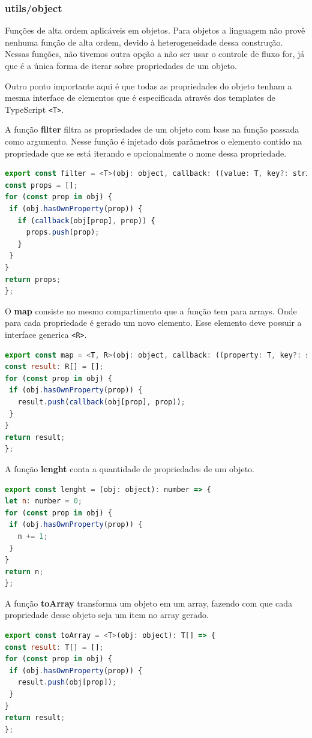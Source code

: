 \documentclass[rel_mlp]{iiufrgs}
\begin{document}
\subsubsection{utils/object}
Funções de alta ordem aplicáveis em objetos. Para objetos a linguagem não provê nenhuma função de alta ordem, devido à heterogeneidade dessa construção. Nessas funções, não tivemos outra opção a não ser usar o controle de fluxo for, já que é a única forma de iterar sobre propriedades de um objeto. \par Outro ponto importante aqui é que todas as propriedades do objeto tenham a mesma interface de elementos que é especificada através dos templates de TypeScript \verb|<T>|.

A função \textbf{filter} filtra as propriedades de um objeto com base na função passada como argumento. Nesse função é injetado dois parâmetros o elemento contido na propriedade que se está iterando e opcionalmente o nome dessa propriedade.

\begin{lstlisting}[language=JavaScript]
export const filter = <T>(obj: object, callback: ((value: T, key?: string) => boolean)): string[] => {
const props = [];
for (const prop in obj) {
 if (obj.hasOwnProperty(prop)) {
   if (callback(obj[prop], prop)) {
     props.push(prop);
   }
 }
}
return props;
};
\end{lstlisting}

O \textbf{map} consiste no mesmo compartimento que a função tem para arrays. Onde para cada propriedade é gerado um novo elemento. Esse elemento deve possuir a interface generica \verb|<R>|.
\begin{lstlisting}[language = JavaScript]
export const map = <T, R>(obj: object, callback: ((property: T, key?: string) => R)): R[] => {
const result: R[] = [];
for (const prop in obj) {
 if (obj.hasOwnProperty(prop)) {
   result.push(callback(obj[prop], prop));
 }
}
return result;
};
\end{lstlisting}

A função \textbf{lenght} conta a quantidade de propriedades de um objeto.
\begin{lstlisting}[language = JavaScript]
export const lenght = (obj: object): number => {
let n: number = 0;
for (const prop in obj) {
 if (obj.hasOwnProperty(prop)) {
   n += 1;
 }
}
return n;
};
\end{lstlisting}

A função \textbf{toArray} transforma um objeto em um array, fazendo com que cada propriedade desse objeto seja um item no array gerado.
\begin{lstlisting}[language = JavaScript]
export const toArray = <T>(obj: object): T[] => {
const result: T[] = [];
for (const prop in obj) {
 if (obj.hasOwnProperty(prop)) {
   result.push(obj[prop]);
 }
}
return result;
};

\end{lstlisting}
\end{document}
